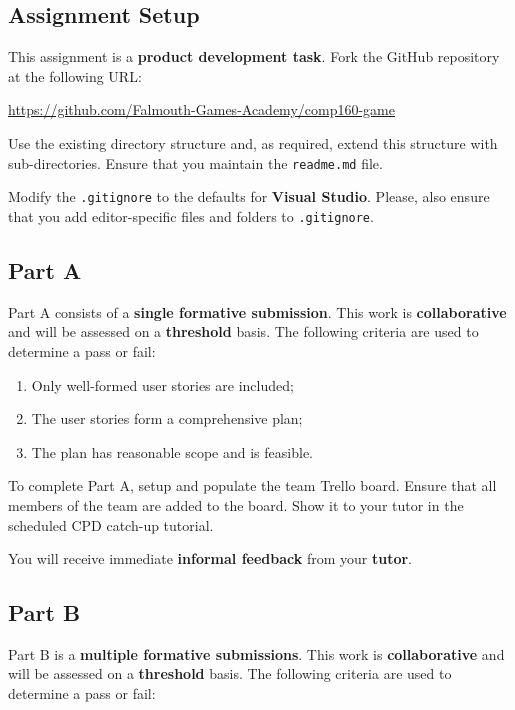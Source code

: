 \documentclass{../fal_assignment}
\begin{document}
\subsection*{Assignment Setup}

This assignment is a \textbf{product development task}. Fork the GitHub repository at the following URL:

\indent \url{https://github.com/Falmouth-Games-Academy/comp160-game}

Use the existing directory structure and, as required, extend this structure with sub-directories. Ensure that you maintain the \texttt{readme.md} file.

Modify the \texttt{.gitignore} to the defaults for \textbf{Visual Studio}. Please, also ensure that you add editor-specific files and folders to \texttt{.gitignore}. 

\subsection*{Part A}

Part A consists of a \textbf{single formative submission}. This work is \textbf{collaborative} and will be assessed on a \textbf{threshold} basis. The following criteria are used to determine a pass or fail:

\begin{enumerate}[label=(\alph*)]
	\item Only well-formed user stories are included;
	\item The user stories form a comprehensive plan;
	\item The plan has reasonable scope and is feasible.
\end{enumerate}

To complete Part A, setup and populate the team Trello board. Ensure that all members of the team are added to the board. Show it to your tutor in the scheduled CPD catch-up tutorial.

You will receive immediate \textbf{informal feedback} from your \textbf{tutor}.

\subsection*{Part B}

Part B is a \textbf{multiple formative submissions}. This work is \textbf{collaborative} and will be assessed on a \textbf{threshold} basis. The following criteria are used to determine a pass or fail:
\end{document}
